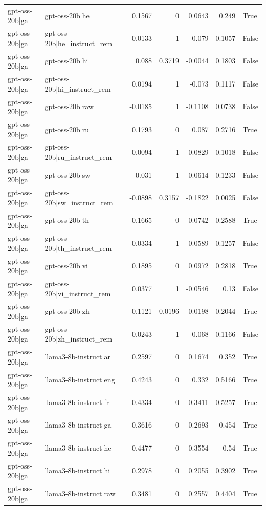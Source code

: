 \begin{table}
\begin{tabular}{l l r r r r l}
gpt-oss-20b|ga & gpt-oss-20b|he & 0.1567 & 0 & 0.0643 & 0.249 & True \\
gpt-oss-20b|ga & gpt-oss-20b|he_instruct_rem & 0.0133 & 1 & -0.079 & 0.1057 & False \\
gpt-oss-20b|ga & gpt-oss-20b|hi & 0.088 & 0.3719 & -0.0044 & 0.1803 & False \\
gpt-oss-20b|ga & gpt-oss-20b|hi_instruct_rem & 0.0194 & 1 & -0.073 & 0.1117 & False \\
gpt-oss-20b|ga & gpt-oss-20b|raw & -0.0185 & 1 & -0.1108 & 0.0738 & False \\
gpt-oss-20b|ga & gpt-oss-20b|ru & 0.1793 & 0 & 0.087 & 0.2716 & True \\
gpt-oss-20b|ga & gpt-oss-20b|ru_instruct_rem & 0.0094 & 1 & -0.0829 & 0.1018 & False \\
gpt-oss-20b|ga & gpt-oss-20b|sw & 0.031 & 1 & -0.0614 & 0.1233 & False \\
gpt-oss-20b|ga & gpt-oss-20b|sw_instruct_rem & -0.0898 & 0.3157 & -0.1822 & 0.0025 & False \\
gpt-oss-20b|ga & gpt-oss-20b|th & 0.1665 & 0 & 0.0742 & 0.2588 & True \\
gpt-oss-20b|ga & gpt-oss-20b|th_instruct_rem & 0.0334 & 1 & -0.0589 & 0.1257 & False \\
gpt-oss-20b|ga & gpt-oss-20b|vi & 0.1895 & 0 & 0.0972 & 0.2818 & True \\
gpt-oss-20b|ga & gpt-oss-20b|vi_instruct_rem & 0.0377 & 1 & -0.0546 & 0.13 & False \\
gpt-oss-20b|ga & gpt-oss-20b|zh & 0.1121 & 0.0196 & 0.0198 & 0.2044 & True \\
gpt-oss-20b|ga & gpt-oss-20b|zh_instruct_rem & 0.0243 & 1 & -0.068 & 0.1166 & False \\
gpt-oss-20b|ga & llama3-8b-instruct|ar & 0.2597 & 0 & 0.1674 & 0.352 & True \\
gpt-oss-20b|ga & llama3-8b-instruct|eng & 0.4243 & 0 & 0.332 & 0.5166 & True \\
gpt-oss-20b|ga & llama3-8b-instruct|fr & 0.4334 & 0 & 0.3411 & 0.5257 & True \\
gpt-oss-20b|ga & llama3-8b-instruct|ga & 0.3616 & 0 & 0.2693 & 0.454 & True \\
gpt-oss-20b|ga & llama3-8b-instruct|he & 0.4477 & 0 & 0.3554 & 0.54 & True \\
gpt-oss-20b|ga & llama3-8b-instruct|hi & 0.2978 & 0 & 0.2055 & 0.3902 & True \\
gpt-oss-20b|ga & llama3-8b-instruct|raw & 0.3481 & 0 & 0.2557 & 0.4404 & True \\

\end{tabular}
\end{table}
